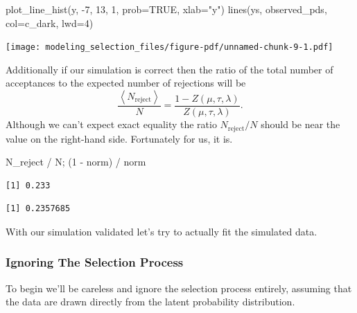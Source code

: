 \documentclass[
  letterpaper,
  DIV=11,
  numbers=noendperiod]{scrartcl}
\newenvironment{Shaded}{\begin{snugshade}}{\end{snugshade}}
\newcommand{\AttributeTok}[1]{\textcolor[rgb]{0.40,0.45,0.13}{#1}}
\newcommand{\ConstantTok}[1]{\textcolor[rgb]{0.56,0.35,0.01}{#1}}
\newcommand{\DecValTok}[1]{\textcolor[rgb]{0.68,0.00,0.00}{#1}}
\newcommand{\FunctionTok}[1]{\textcolor[rgb]{0.28,0.35,0.67}{#1}}
\newcommand{\NormalTok}[1]{\textcolor[rgb]{0.00,0.23,0.31}{#1}}
\newcommand{\SpecialCharTok}[1]{\textcolor[rgb]{0.37,0.37,0.37}{#1}}
\newcommand{\StringTok}[1]{\textcolor[rgb]{0.13,0.47,0.30}{#1}}
\begin{document}
\begin{Shaded}
\begin{Highlighting}[]
\FunctionTok{plot\_line\_hist}\NormalTok{(y, }\SpecialCharTok{{-}}\DecValTok{7}\NormalTok{, }\DecValTok{13}\NormalTok{, }\DecValTok{1}\NormalTok{, }\AttributeTok{prob=}\ConstantTok{TRUE}\NormalTok{, }\AttributeTok{xlab=}\StringTok{"y"}\NormalTok{)}
\FunctionTok{lines}\NormalTok{(ys, observed\_pds, }\AttributeTok{col=}\NormalTok{c\_dark, }\AttributeTok{lwd=}\DecValTok{4}\NormalTok{)}
\end{Highlighting}
\end{Shaded}

\texttt{[image: modeling\_selection\_files/figure-pdf/unnamed-chunk-9-1.pdf]}

Additionally if our simulation is correct then the ratio of the total
number of acceptances to the expected number of rejections will be \[
\frac{ \left< N_{\text{reject}} \right> }{ N }
=
\frac{ 1 - Z(\mu, \tau, \lambda) }{ Z(\mu, \tau, \lambda) }.
\] Although we can't expect exact equality the ratio
\(N_{\text{reject}} / N\) should be near the value on the right-hand
side. Fortunately for us, it is.

\begin{Shaded}
\begin{Highlighting}[]
\NormalTok{N\_reject }\SpecialCharTok{/}\NormalTok{ N; (}\DecValTok{1} \SpecialCharTok{{-}}\NormalTok{ norm) }\SpecialCharTok{/}\NormalTok{ norm}
\end{Highlighting}
\end{Shaded}

\begin{verbatim}
[1] 0.233
\end{verbatim}

\begin{verbatim}
[1] 0.2357685
\end{verbatim}

With our simulation validated let's try to actually fit the simulated
data.

\subsubsection{Ignoring The Selection
Process}\label{ignoring-the-selection-process}

To begin we'll be careless and ignore the selection process entirely,
assuming that the data are drawn directly from the latent probability
distribution.
\end{document}

